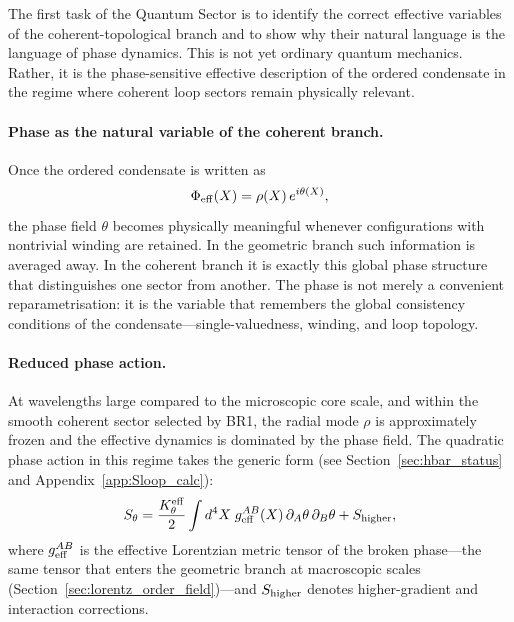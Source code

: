 \documentclass[11pt,a4paper]{article}
\numberwithin{equation}{section}
\begin{document}
\medskip
The first task of the Quantum Sector is to identify the correct
effective variables of the coherent-topological branch and to show
why their natural language is the language of phase dynamics.
This is not yet ordinary quantum mechanics.
Rather, it is the phase-sensitive effective description of the ordered
condensate in the regime where coherent loop sectors remain
physically relevant.

\paragraph{Phase as the natural variable of the coherent branch.}
Once the ordered condensate is written as
\begin{equation}
  \Phi_{\rm eff}(X) = \rho(X)\,e^{i\theta(X)},
  \label{eq:qs_polar}
\end{equation}
the phase field $\theta$ becomes physically meaningful whenever
configurations with nontrivial winding are retained.
In the geometric branch such information is averaged away.
In the coherent branch it is exactly this global phase structure that
distinguishes one sector from another.
The phase is not merely a convenient reparametrisation: it is the
variable that remembers the global consistency conditions of the
condensate---single-valuedness, winding, and loop topology.

\paragraph{Reduced phase action.}
At wavelengths large compared to the microscopic core scale, and within
the smooth coherent sector selected by BR1, the radial mode $\rho$ is
approximately frozen and the effective dynamics is dominated by the
phase field.
The quadratic phase action in this regime takes the generic form
(see Section~\ref{sec:hbar_status} and Appendix~\ref{app:Sloop_calc}):
\begin{equation}
  \label{eq:qs_phase_action}
  S_\theta
  =
  \frac{K_\theta^{\rm eff}}{2}
  \int d^4X\; g_{\rm eff}^{AB}(X)\,\partial_A\theta\,\partial_B\theta
  + S_{\rm higher},
\end{equation}
where $g_{\rm eff}^{AB}$ is the effective Lorentzian metric tensor of
the broken phase---the same tensor that enters the geometric branch at
macroscopic scales (Section~\ref{sec:lorentz_order_field})---and
$S_{\rm higher}$ denotes higher-gradient and interaction corrections.
\end{document}
